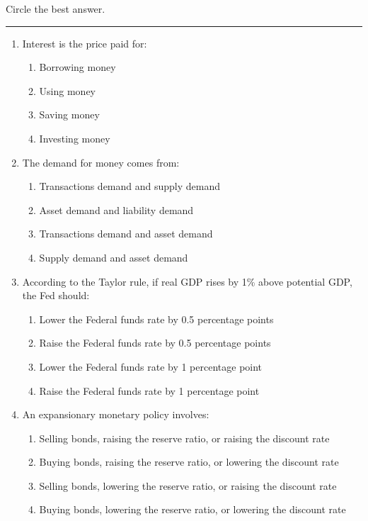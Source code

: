 Circle the best answer.

\large




\medskip\hrule
\begin{enumerate}

  \item Interest is the price paid for:
        \begin{enumerate}
          \item Borrowing money
          \item Using money
          \item Saving money
          \item Investing money
        \end{enumerate}

  \item The demand for money comes from:
        \begin{enumerate}
          \item Transactions demand and supply demand
          \item Asset demand and liability demand
          \item Transactions demand and asset demand
          \item Supply demand and asset demand
        \end{enumerate}

  \item According to the Taylor rule, if real GDP rises by 1\% above potential GDP, the Fed should:
        \begin{enumerate}
          \item Lower the Federal funds rate by 0.5 percentage points
          \item Raise the Federal funds rate by 0.5 percentage points
          \item Lower the Federal funds rate by 1 percentage point
          \item Raise the Federal funds rate by 1 percentage point
        \end{enumerate}

        \columnbreak

  \item An expansionary monetary policy involves:
        \begin{enumerate}
          \item Selling bonds, raising the reserve ratio, or raising the discount rate
          \item Buying bonds, raising the reserve ratio, or lowering the discount rate
          \item Selling bonds, lowering the reserve ratio, or raising the discount rate
          \item Buying bonds, lowering the reserve ratio, or lowering the discount rate
        \end{enumerate}


\end{enumerate}
